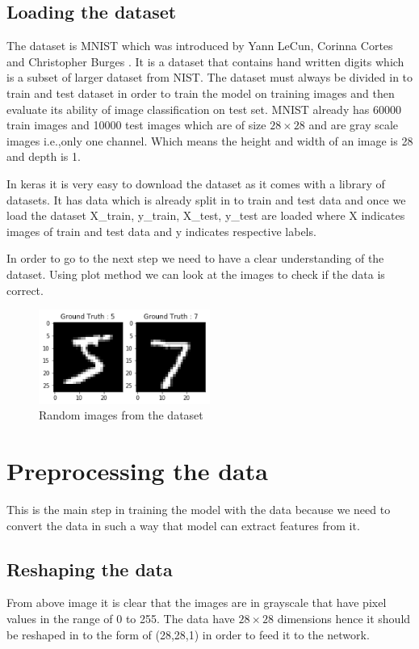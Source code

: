 \subsection{Loading the dataset}
 
The dataset is MNIST which was introduced by Yann LeCun, Corinna Cortes and Christopher Burges \cite{LeCun}. It is a dataset that contains hand written digits which is a subset of larger dataset from NIST. The dataset must always be divided in to train and test dataset in order to train the model on training images and then evaluate its ability of image classification on test set. MNIST already has 60000 train images and 10000 test images which are of size $28\times28$ and are gray scale images i.e.,only one channel. Which means the height and width of an image is 28 and depth is 1. 
 
\noindent In keras it is very easy to download the dataset as it comes with a library of datasets. It has data which is already split in to train and test data and once we load the dataset X\_train, y\_train, X\_test, y\_test are loaded where X indicates images of train and test data and y indicates respective labels.

In order to go to the next step we need to have a clear understanding of the dataset. Using plot method we can look at the images to check if the data is correct. 
\begin{figure}[h]
    \centering
    \includegraphics[width=0.5\textwidth]{thesis_template/images/screenshot.png}
    \caption{\small Random images from the dataset}
    \label{}
    \end{figure}
    
 
\newpage \section{Preprocessing the data}

This is the main step in training the model with the data because we need to convert the data in such a way that model can extract features from it. 
\subsection{Reshaping the data}
From above image it is clear that the images are in grayscale that have pixel values in the range of 0 to 255.
The data have $ 28\times28 $ dimensions hence it should be reshaped in to the form of (28,28,1) in order to feed it to the network. 

